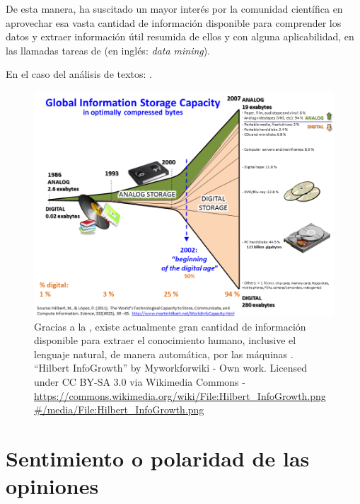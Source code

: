 De esta manera, ha suscitado un mayor interés por la comunidad científica en aprovechar esa vasta cantidad de información disponible para comprender los datos y extraer información útil resumida de ellos y con alguna aplicabilidad, en las llamadas tareas de  (en inglés: \emph{data mining}).

En el caso del análisis de textos: .

\begin{landscape}
\begin{figure}[htbp]
\centering
\includegraphics[height=0.85\textwidth]{Hilbert-InfoGrowth}
\caption[Explosión de información digital]{Gracias a la , existe actualmente gran cantidad de información disponible para extraer el conocimiento humano, inclusive el lenguaje natural, de manera automática, por las máquinas \citep{Hilbert2011}. \\
{\footnotesize ``Hilbert InfoGrowth'' by Myworkforwiki - Own work. Licensed under CC BY-SA 3.0 via Wikimedia Commons - \url{https://commons.wikimedia.org/wiki/File:Hilbert_InfoGrowth.png\#/media/File:Hilbert_InfoGrowth.png}}}
\label{fig:InfoGrowth}
\end{figure}
\end{landscape}

\section{Sentimiento o polaridad de las opiniones}

